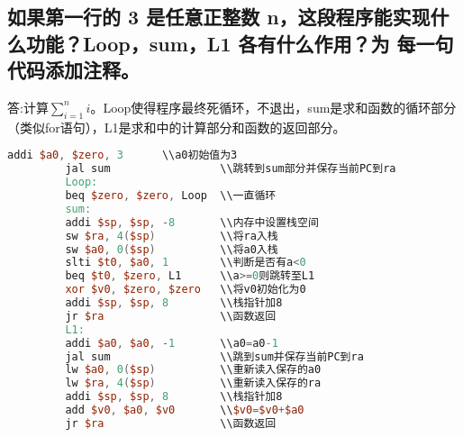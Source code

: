 \documentclass{ctexart}
\begin{document}
         \subsection {如果第一行的 3 是任意正整数 n，这段程序能实现什么功能？Loop，sum，L1 各有什么作用？为
         每一句代码添加注释。}
         答:计算$\sum_{i=1}^ni$。Loop使得程序最终死循环，不退出，sum是求和函数的循环部分（类似for语句），L1是求和中的计算部分和函数的返回部分。
         \begin{lstlisting}[language=verilog]
         addi $a0, $zero, 3      \\a0初始值为3
         jal sum                 \\跳转到sum部分并保存当前PC到ra
         Loop:
         beq $zero, $zero, Loop  \\一直循环
         sum:
         addi $sp, $sp, -8       \\内存中设置栈空间
         sw $ra, 4($sp)          \\将ra入栈
         sw $a0, 0($sp)          \\将a0入栈
         slti $t0, $a0, 1        \\判断是否有a<0
         beq $t0, $zero, L1      \\a>=0则跳转至L1
         xor $v0, $zero, $zero   \\将v0初始化为0
         addi $sp, $sp, 8        \\栈指针加8
         jr $ra                  \\函数返回
         L1:
         addi $a0, $a0, -1       \\a0=a0-1
         jal sum                 \\跳到sum并保存当前PC到ra
         lw $a0, 0($sp)          \\重新读入保存的a0
         lw $ra, 4($sp)          \\重新读入保存的ra
         addi $sp, $sp, 8        \\栈指针加8
         add $v0, $a0, $v0       \\$v0=$v0+$a0
         jr $ra                  \\函数返回
         \end{lstlisting}
\end{document}
